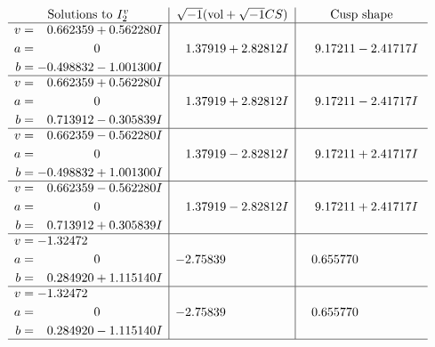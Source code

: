 \documentclass[1p]{elsarticle_modified}
\theoremstyle{definition}
\newcommand{\I}{\sqrt{-1}}
\begin{document}
$$\begin{array}{c|c|c}  
\text{Solutions to }I^v_{2}& \I (\text{vol} + \sqrt{-1}CS) & \text{Cusp shape}\\
 \hline 
\begin{aligned}
v &= \phantom{-}0.662359 + 0.562280 I \\
a &= \phantom{-0.000000 } 0 \\
b &= -0.498832 - 1.001300 I\end{aligned}
 & \phantom{-}1.37919 + 2.82812 I & \phantom{-}9.17211 - 2.41717 I \\ \hline\begin{aligned}
v &= \phantom{-}0.662359 + 0.562280 I \\
a &= \phantom{-0.000000 } 0 \\
b &= \phantom{-}0.713912 - 0.305839 I\end{aligned}
 & \phantom{-}1.37919 + 2.82812 I & \phantom{-}9.17211 - 2.41717 I \\ \hline\begin{aligned}
v &= \phantom{-}0.662359 - 0.562280 I \\
a &= \phantom{-0.000000 } 0 \\
b &= -0.498832 + 1.001300 I\end{aligned}
 & \phantom{-}1.37919 - 2.82812 I & \phantom{-}9.17211 + 2.41717 I \\ \hline\begin{aligned}
v &= \phantom{-}0.662359 - 0.562280 I \\
a &= \phantom{-0.000000 } 0 \\
b &= \phantom{-}0.713912 + 0.305839 I\end{aligned}
 & \phantom{-}1.37919 - 2.82812 I & \phantom{-}9.17211 + 2.41717 I \\ \hline\begin{aligned}
v &= -1.32472\phantom{ +0.000000I} \\
a &= \phantom{-0.000000 } 0 \\
b &= \phantom{-}0.284920 + 1.115140 I\end{aligned}
 & -2.75839\phantom{ +0.000000I} & \phantom{-}0.655770\phantom{ +0.000000I} \\ \hline\begin{aligned}
v &= -1.32472\phantom{ +0.000000I} \\
a &= \phantom{-0.000000 } 0 \\
b &= \phantom{-}0.284920 - 1.115140 I\end{aligned}
 & -2.75839\phantom{ +0.000000I} & \phantom{-}0.655770\phantom{ +0.000000I}\\
 \hline 
 \end{array}$$\newpage
\end{document}
